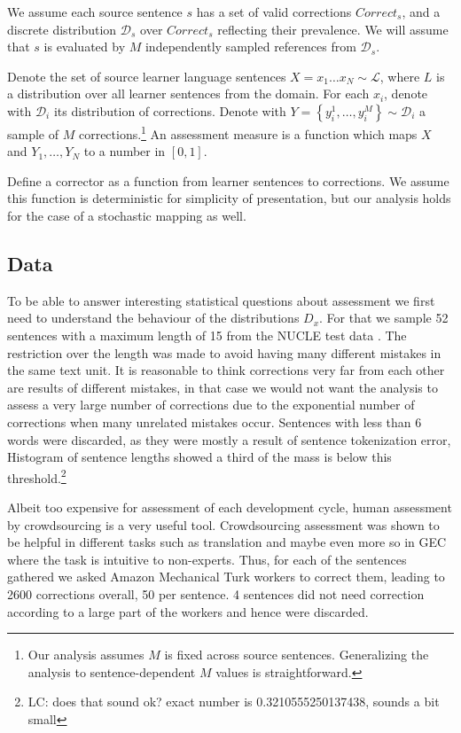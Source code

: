 \documentclass[letter,11pt]{article}
\newcommand{\lc}[1]{\footnote{\color{green}LC: #1}}
\begin{document}
We assume each source sentence $s$ has a set of valid corrections $Correct_s$,
and a discrete distribution $\mathcal{D}_s$ over $Correct_s$ reflecting their prevalence.
We will assume that $s$ is evaluated by
$M$ independently sampled references from $\mathcal{D}_s$.

Denote the set of source learner language sentences $X=x_{1}\ldots x_N \sim \mathcal{L}$, where
$L$ is a distribution over all learner sentences from the domain. For each $x_i$, denote
with $\mathcal{D}_{i}$ its distribution of corrections.
Denote with $Y = \left\{y_{i}^{1},\ldots, y_{i}^{M}\right\} \sim \mathcal{D}_{i}$
a sample of $M$ corrections.\footnote{Our analysis assumes $M$ is fixed across source sentences.
  Generalizing the analysis to sentence-dependent $M$ values is straightforward.}
An assessment measure is a function which maps $X$ and $Y_1,\ldots,Y_N$ to
a number in $[0,1]$.

Define a corrector as a function from learner sentences to corrections.
We assume this function is deterministic for simplicity of presentation,
but our analysis holds for the case of a stochastic mapping as well.


\subsection{Data}

To be able to answer interesting statistical questions about assessment we first
need to understand the behaviour of the distributions $D_x$. For that we sample
52 sentences with a maximum length of 15 from the NUCLE test data
\cite{dahlmeier2013building}. The restriction over the length was made to avoid having many different mistakes in the same text unit. It is reasonable to think corrections very far from each other are results of different mistakes, in that case we would not want the analysis to assess a very large number of corrections due to the exponential number of corrections when many unrelated mistakes occur.
Sentences with less than 6 words were discarded, as they were mostly a result of sentence tokenization error,
Histogram of sentence lengths showed a third of the mass is below this threshold.\lc{does that sound ok? exact number is 0.3210555250137438, sounds a bit small}

Albeit too expensive for assessment of each development cycle, human assessment
by crowdsourcing is a very useful tool. Crowdsourcing assessment was shown to
be helpful in different tasks such as translation
\cite{zaidan2011crowdsourcing, post2012constructing}
and maybe even more so in GEC \cite{madnani2011they} where the task is intuitive to non-experts.
Thus, for each of the sentences gathered we asked Amazon Mechanical Turk workers to correct them, leading to 2600 corrections overall,
50 per sentence. 4 sentences did not need correction according to a large part of the workers and hence were discarded.
\end{document}
